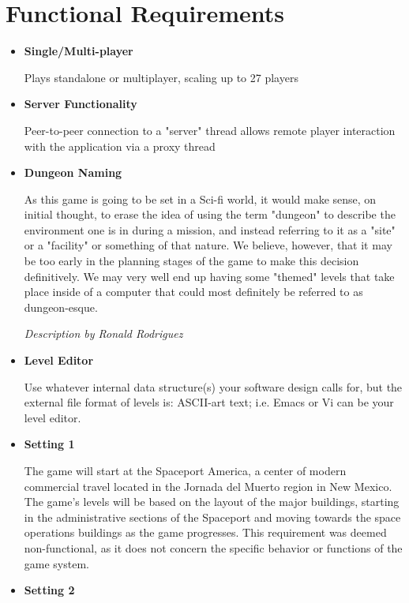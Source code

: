 \documentclass[12pt]{article}
\begin{document}
\section{Functional Requirements}
\begin{itemize}
	\item \textbf{Single/Multi-player}
	
	Plays standalone or multiplayer, scaling up to 27 players
	
	\item \textbf{Server Functionality}
	
	Peer-to-peer connection to a "server" thread allows remote player
	interaction with the application via a proxy thread
	
	\item \textbf{Dungeon Naming} 
	
	As this game is going to be set in a Sci-fi world, it would make sense, on 
	initial thought, to erase the idea of using the term "dungeon" to describe 
	the environment one is in during a mission, and instead referring to it as 
	a "site" or a "facility" or something of that nature. We believe, however, 
	that it may be too early in the planning stages of the game to make this 
	decision definitively. We may very well end up having some "themed" levels 
	that take place inside of a computer that could most definitely be referred 
	to as dungeon-esque. 
	
	\emph{Description by Ronald Rodriguez}
	
	\item \textbf{Level Editor}
	
	Use whatever internal data structure(s) your software design calls
	for, but the external file format of levels is: ASCII-art text; i.e.
	Emacs or Vi can be your level editor.
	
	\item \textbf{Setting 1}
	
	The game will start at the Spaceport America, a center of modern commercial
	travel located in the Jornada del Muerto region in New Mexico. The game's levels
	will be based on the layout of the major buildings, starting in the 
	administrative sections of the Spaceport and moving towards the space operations
	buildings as the game progresses. This requirement was deemed non-functional, 
	as it does not concern the specific behavior or functions of the game system.
	
	\item \textbf{Setting 2}
	

\end{itemize}
\end{document}
